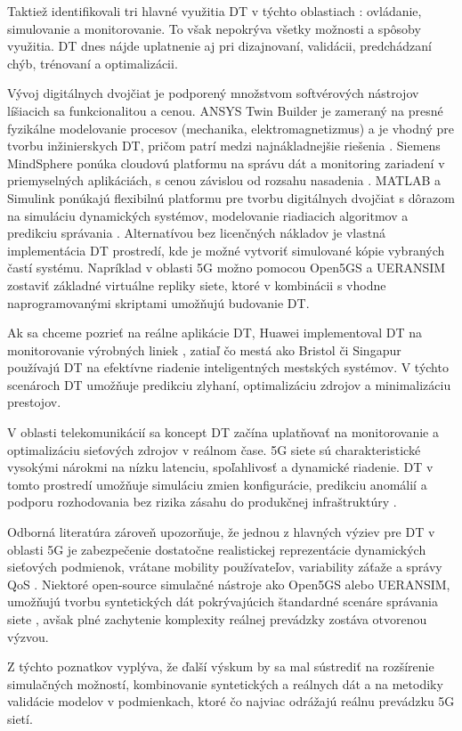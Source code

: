 Taktiež identifikovali tri hlavné využitia DT v týchto oblastiach \cite{AplicationsOfDT}: ovládanie, simulovanie a monitorovanie. To však nepokrýva všetky možnosti a spôsoby využitia. DT dnes nájde uplatnenie aj pri dizajnovaní, validácii, predchádzaní chýb, trénovaní a optimalizácii.

Vývoj digitálnych dvojčiat je podporený množstvom softvérových nástrojov líšiacich sa funkcionalitou a cenou. ANSYS Twin Builder je zameraný na presné fyzikálne modelovanie procesov (mechanika, elektromagnetizmus) a je vhodný pre tvorbu inžinierskych DT, pričom patrí medzi najnákladnejšie riešenia \cite{ansys_twin_builder}. Siemens MindSphere ponúka cloudovú platformu na správu dát a monitoring zariadení v priemyselných aplikáciách, s cenou závislou od rozsahu nasadenia \cite{siemens_mindsphere}. MATLAB a Simulink ponúkajú flexibilnú platformu pre tvorbu digitálnych dvojčiat s dôrazom na simuláciu dynamických systémov, modelovanie riadiacich algoritmov a predikciu správania \cite{mathworks_digital_twin}.
Alternatívou bez licenčných nákladov je vlastná implementácia DT prostredí, kde je možné vytvoriť simulované kópie vybraných častí systému. Napríklad v oblasti 5G možno pomocou Open5GS a UERANSIM zostaviť základné virtuálne repliky siete, ktoré v kombinácii s vhodne naprogramovanými skriptami umožňujú budovanie DT.

Ak sa chceme pozrieť na reálne aplikácie DT, Huawei implementoval DT na monitorovanie výrobných liniek \cite{huawei2020}, zatiaľ čo mestá ako Bristol \cite{Bristol} či Singapur \cite{singapur} používajú DT na efektívne riadenie inteligentných mestských systémov. V týchto scenároch DT umožňuje predikciu zlyhaní, optimalizáciu zdrojov a minimalizáciu prestojov. 

V oblasti telekomunikácií sa koncept DT začína uplatňovať na monitorovanie a optimalizáciu sieťových zdrojov v reálnom čase. 5G siete sú charakteristické vysokými nárokmi na nízku latenciu, spoľahlivosť a dynamické riadenie. DT v tomto prostredí umožňuje simuláciu zmien konfigurácie, predikciu anomálií a podporu rozhodovania bez rizika zásahu do produkčnej infraštruktúry \cite{JONES202036}.

Odborná literatúra zároveň upozorňuje, že jednou z hlavných výziev pre DT v oblasti 5G je zabezpečenie dostatočne realistickej reprezentácie dynamických sieťových podmienok, vrátane mobility používateľov, variability záťaže a správy QoS \cite{theDigTwin}.
Niektoré open-source simulačné nástroje ako Open5GS alebo UERANSIM, umožňujú tvorbu syntetických dát pokrývajúcich štandardné scenáre správania siete \cite{openanduerans}, avšak plné zachytenie komplexity reálnej prevádzky zostáva otvorenou výzvou.

Z týchto poznatkov vyplýva, že ďalší výskum by sa mal sústrediť na rozšírenie simulačných možností, kombinovanie syntetických a reálnych dát a na metodiky validácie modelov v podmienkach, ktoré čo najviac odrážajú reálnu prevádzku 5G sietí.